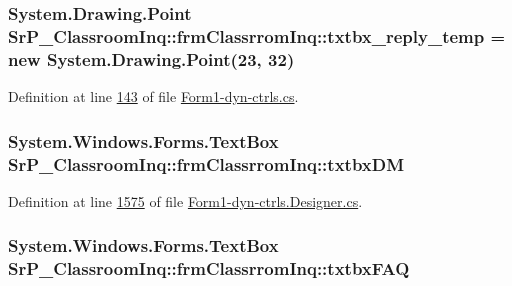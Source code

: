 \hypertarget{class_sr_p___classroom_inq_1_1frm_classrrom_inq_a0b175596cb83997b38795ee916c978f1}{
\subsubsection[{txtbx\-\_\-reply\-\_\-temp}]{\setlength{\rightskip}{0pt plus 5cm}\-System.\-Drawing.\-Point {\bf \-Sr\-P\-\_\-\-Classroom\-Inq\-::frm\-Classrrom\-Inq\-::txtbx\-\_\-reply\-\_\-temp} = new \-System.\-Drawing.\-Point(23, 32)}}
\label{class_sr_p___classroom_inq_1_1frm_classrrom_inq_a0b175596cb83997b38795ee916c978f1}


\-Definition at line \hyperlink{_form1-dyn-ctrls_8cs_source_l00143}{143} of file \hyperlink{_form1-dyn-ctrls_8cs_source}{\-Form1-\/dyn-\/ctrls.\-cs}.

\hypertarget{class_sr_p___classroom_inq_1_1frm_classrrom_inq_aec9084c69e8f5c7398f201a074db8550}{
\subsubsection[{txtbx\-D\-M}]{\setlength{\rightskip}{0pt plus 5cm}\-System.\-Windows.\-Forms.\-Text\-Box {\bf \-Sr\-P\-\_\-\-Classroom\-Inq\-::frm\-Classrrom\-Inq\-::txtbx\-D\-M}}}
\label{class_sr_p___classroom_inq_1_1frm_classrrom_inq_aec9084c69e8f5c7398f201a074db8550}


\-Definition at line \hyperlink{_form1-dyn-ctrls_8_designer_8cs_source_l01575}{1575} of file \hyperlink{_form1-dyn-ctrls_8_designer_8cs_source}{\-Form1-\/dyn-\/ctrls.\-Designer.\-cs}.

\hypertarget{class_sr_p___classroom_inq_1_1frm_classrrom_inq_a891afdbfba3ee4c1b690b938693ecabe}{
\subsubsection[{txtbx\-F\-A\-Q}]{\setlength{\rightskip}{0pt plus 5cm}\-System.\-Windows.\-Forms.\-Text\-Box {\bf \-Sr\-P\-\_\-\-Classroom\-Inq\-::frm\-Classrrom\-Inq\-::txtbx\-F\-A\-Q}}}
\label{class_sr_p___classroom_inq_1_1frm_classrrom_inq_a891afdbfba3ee4c1b690b938693ecabe}


